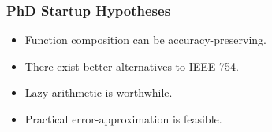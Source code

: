 \begin{frame}

\frametitle{PhD Startup Hypotheses}

\vspace{\fill}

\begin{itemize}

\item Function composition can be accuracy-preserving.

\item There exist better alternatives to IEEE-754.

\item Lazy arithmetic is worthwhile.

\item Practical error-approximation is feasible.

\end{itemize}

\vspace{\fill}

\end{frame}
